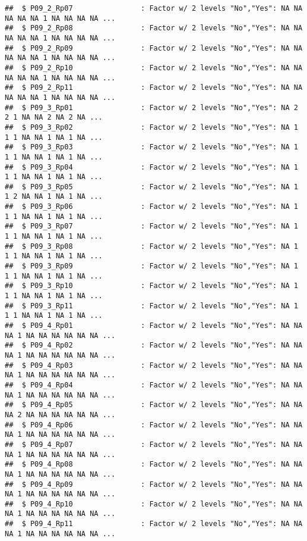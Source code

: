 \documentclass[
]{article}
\begin{document}
\begin{verbatim}
##  $ P09_2_Rp07                : Factor w/ 2 levels "No","Yes": NA NA NA NA NA 1 NA NA NA NA ...
##  $ P09_2_Rp08                : Factor w/ 2 levels "No","Yes": NA NA NA NA NA 1 NA NA NA NA ...
##  $ P09_2_Rp09                : Factor w/ 2 levels "No","Yes": NA NA NA NA NA 1 NA NA NA NA ...
##  $ P09_2_Rp10                : Factor w/ 2 levels "No","Yes": NA NA NA NA NA 1 NA NA NA NA ...
##  $ P09_2_Rp11                : Factor w/ 2 levels "No","Yes": NA NA NA NA NA 1 NA NA NA NA ...
##  $ P09_3_Rp01                : Factor w/ 2 levels "No","Yes": NA 2 2 1 NA NA 2 NA 2 NA ...
##  $ P09_3_Rp02                : Factor w/ 2 levels "No","Yes": NA 1 1 1 NA NA 1 NA 1 NA ...
##  $ P09_3_Rp03                : Factor w/ 2 levels "No","Yes": NA 1 1 1 NA NA 1 NA 1 NA ...
##  $ P09_3_Rp04                : Factor w/ 2 levels "No","Yes": NA 1 1 1 NA NA 1 NA 1 NA ...
##  $ P09_3_Rp05                : Factor w/ 2 levels "No","Yes": NA 1 1 2 NA NA 1 NA 1 NA ...
##  $ P09_3_Rp06                : Factor w/ 2 levels "No","Yes": NA 1 1 1 NA NA 1 NA 1 NA ...
##  $ P09_3_Rp07                : Factor w/ 2 levels "No","Yes": NA 1 1 1 NA NA 1 NA 1 NA ...
##  $ P09_3_Rp08                : Factor w/ 2 levels "No","Yes": NA 1 1 1 NA NA 1 NA 1 NA ...
##  $ P09_3_Rp09                : Factor w/ 2 levels "No","Yes": NA 1 1 1 NA NA 1 NA 1 NA ...
##  $ P09_3_Rp10                : Factor w/ 2 levels "No","Yes": NA 1 1 1 NA NA 1 NA 1 NA ...
##  $ P09_3_Rp11                : Factor w/ 2 levels "No","Yes": NA 1 1 1 NA NA 1 NA 1 NA ...
##  $ P09_4_Rp01                : Factor w/ 2 levels "No","Yes": NA NA NA 1 NA NA NA NA NA NA ...
##  $ P09_4_Rp02                : Factor w/ 2 levels "No","Yes": NA NA NA 1 NA NA NA NA NA NA ...
##  $ P09_4_Rp03                : Factor w/ 2 levels "No","Yes": NA NA NA 1 NA NA NA NA NA NA ...
##  $ P09_4_Rp04                : Factor w/ 2 levels "No","Yes": NA NA NA 1 NA NA NA NA NA NA ...
##  $ P09_4_Rp05                : Factor w/ 2 levels "No","Yes": NA NA NA 2 NA NA NA NA NA NA ...
##  $ P09_4_Rp06                : Factor w/ 2 levels "No","Yes": NA NA NA 1 NA NA NA NA NA NA ...
##  $ P09_4_Rp07                : Factor w/ 2 levels "No","Yes": NA NA NA 1 NA NA NA NA NA NA ...
##  $ P09_4_Rp08                : Factor w/ 2 levels "No","Yes": NA NA NA 1 NA NA NA NA NA NA ...
##  $ P09_4_Rp09                : Factor w/ 2 levels "No","Yes": NA NA NA 1 NA NA NA NA NA NA ...
##  $ P09_4_Rp10                : Factor w/ 2 levels "No","Yes": NA NA NA 1 NA NA NA NA NA NA ...
##  $ P09_4_Rp11                : Factor w/ 2 levels "No","Yes": NA NA NA 1 NA NA NA NA NA NA ...

\end{verbatim}
\end{document}
